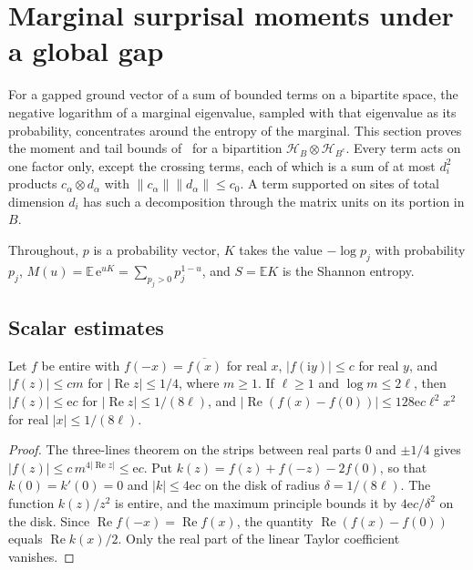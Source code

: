 
\section{Marginal surprisal moments under a global gap}
\label{ch:marginal_tails}

For a gapped ground vector of a sum of bounded terms on a bipartite space,
the negative logarithm of a marginal eigenvalue, sampled with that
eigenvalue as its probability, concentrates around the entropy of the
marginal. This section proves the moment and tail bounds
of~\cite[Lemma~3.1]{OpenAI2026AreaLaw} for a bipartition $\mathcal
    H_B\otimes\mathcal H_{B^c}$. Every term acts on one factor only, except the
crossing terms, each of which is a sum of at most $d_i^2$ products
$c_\alpha\otimes d_\alpha$ with $\lVert c_\alpha\rVert\lVert d_\alpha\rVert\le c_0$.
A term supported on sites of total dimension $d_i$ has such a
decomposition through the matrix units on its portion in $B$.

Throughout, $p$ is a probability vector, $K$ takes the value $-\log p_j$
with probability $p_j$, $M(u)=\mathbb E\,\mathrm e^{uK}=\sum_{p_j>0}p_j^{1-u}$, and
$S=\mathbb E K$ is the Shannon entropy.

\subsection{Scalar estimates}
\label{sec:marginal_tails_scalar}

\begin{lemma}
    \label{lem:strip_quadratic}
    \leanok
    Let $f$ be entire with $f(-x)=\overline{f(x)}$ for real $x$,
    $|f(\mathrm iy)|\le c$ for real $y$, and $|f(z)|\le cm$ for
    $|\operatorname{Re}z|\le1/4$, where $m\ge1$. If $\ell\ge1$ and
    $\log m\le2\ell$, then $|f(z)|\le\mathrm ec$ for
    $|\operatorname{Re}z|\le1/(8\ell)$, and
    $|\operatorname{Re}(f(x)-f(0))|\le128\mathrm ec\ell^2x^2$ for real
    $|x|\le1/(8\ell)$.
\end{lemma}
\begin{proof}\leanok
    The three-lines theorem on the strips between real parts $0$ and $\pm1/4$
    gives $|f(z)|\le c\,m^{4|\operatorname{Re}z|}\le\mathrm ec$. Put
    $k(z)=f(z)+f(-z)-2f(0)$, so that $k(0)=k'(0)=0$ and $|k|\le4\mathrm ec$
    on the disk of radius $\delta=1/(8\ell)$. The function $k(z)/z^2$ is
    entire, and the maximum principle bounds it by $4\mathrm ec/\delta^2$ on
    the disk. Since $\operatorname{Re}f(-x)=\operatorname{Re}f(x)$, the
    quantity $\operatorname{Re}(f(x)-f(0))$ equals $\operatorname{Re}k(x)/2$.
    Only the real part of the linear Taylor coefficient vanishes.
\end{proof}

